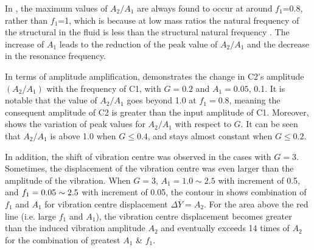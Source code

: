 In , the maximum values of $A_2/A_1$ are always found to occur at around $ f_1 $=0.8, rather than $ f_1 $=1, which is because at low mass ratios the natural frequency of the structural in the fluid is less than the structural natural frequency \cite{Zhao2013}. The increase of $ A_1 $ leads to the reduction of the peak value of $ A_2/A_1 $ and the decrease in the resonance frequency. 

In terms of amplitude amplification,  demonstrates the change in C2's amplitude $ (A_2/A_1) $ with the frequency of C1, with $ G=0.2 $ and $ A_1=0.05 $, 0.1. It is notable that the value of $ A_2/A_1 $ goes beyond 1.0 at $ f_1=0.8 $, meaning the consequent amplitude of C2 is greater than the input amplitude of C1. Moreover,  shows the variation of peak values for $ A_2/A_1 $ with respect to $ G $. It can be seen that $ A_2/A_1 $ is above 1.0 when $ G\leq0.4 $, and stays almost constant when $ G\leq0.2 $.

In addition, the shift of vibration centre was observed in the cases with $ G =3$. Sometimes, the displacement of the vibration centre was even larger than the amplitude of the vibration. When $ G =3$, $ A_1 =1.0 \sim 2.5$ with increment of 0.5, and $ f_1=0.05\sim2.5 $ with increment of 0.05, the contour in  shows combination of $ f_1 $ and $ A_1 $ for vibration centre displacement $\Delta\overline{Y}=A_2$. For the area above the red line (i.e. large $ f_1 $ and $ A_1 $), the vibration centre displacement becomes greater than the induced vibration amplitude $ A_2 $ and eventually exceeds 14 times of $ A_2 $ for the combination of greatest $ A_1 $ \& $ f_1 $. 

